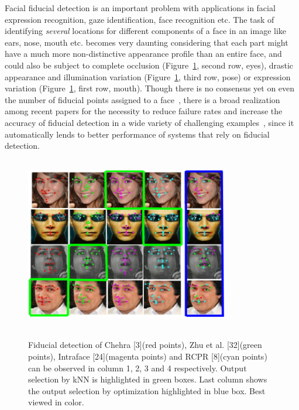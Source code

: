 Facial fiducial detection is an important problem with applications in facial expression 
recognition, gaze identification, face recognition etc. The task of identifying \emph{several}
locations for different components of a face in an image like ears, nose, mouth etc. becomes
very daunting considering that each part might have a much more non-distinctive appearance
profile than an entire face, and could also be subject to complete occlusion
(Figure~\ref{fig:init_fig}, second row, eyes), drastic appearance and illumination variation
(Figure~\ref{fig:init_fig}, third row, pose) or expression variation
(Figure~\ref{fig:init_fig}, first row, mouth).
Though there is no consensus
yet on even the number of fiducial points assigned to a face~\cite{smithECCV14_ED}, there is a
broad realization among recent papers for the necessity to reduce failure rates and increase
the accuracy of fiducial detection in a wide variety of challenging examples~\cite{smithECCV14_ED,
zhouICCV13_EGM, koetsingerBFIAT11_AFLW, kumarPAMI13_faceExem,artizzzuICCV13_COFW,yuECCV14_CoR},
since it automatically lends to better performance of systems that rely on fiducial detection.

\begin{figure}
    \centering
    \includegraphics[width=3.5in, height=3in]{fid/figures/first_page.png}
    \label{fig:init_fig}
    \caption{ Fiducial detection of Chehra [3](red points), Zhu
              et al. [32](green points), Intraface [24](magenta points) and
              RCPR [8](cyan points) can be observed in column 1, 2, 3
              and 4 respectively. Output selection by kNN is highlighted
              in green boxes. Last column shows the output selection by
              optimization highlighted in blue box. Best viewed in color.}
\end{figure}

